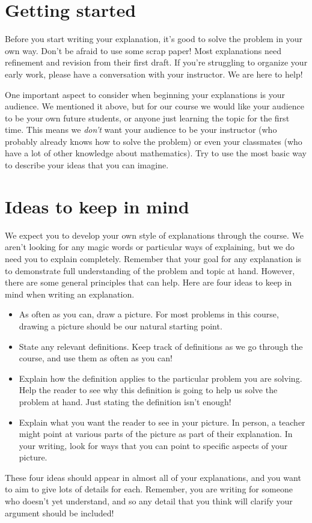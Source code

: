 \documentclass[noauthor,nooutcomes]{ximera}
\begin{document}
\section{Getting started}
Before you start writing your explanation, it's good to solve the problem in your own way. Don't be afraid to use some scrap paper! Most explanations need refinement and revision from their first draft. If you're struggling to organize your early work, please have a conversation with your instructor. We are here to help!

One important aspect to consider when beginning your explanations is your audience. We mentioned it above, but for our course we would like your audience to be your own future students, or anyone just learning the topic for the first time. This means we {\em don't} want your audience to be your instructor (who probably already knows how to solve the problem) or even your classmates (who have a lot of other knowledge about mathematics). Try to use the most basic way to describe your ideas that you can imagine.

\section{Ideas to keep in mind}
We expect you to develop your own style of explanations through the course. We aren't looking for any magic words or particular ways of explaining, but we do need you to explain completely. Remember that your goal for any explanation is to demonstrate full understanding of the problem and topic at hand. However, there are some general principles that can help. Here are four ideas to keep in mind when writing an explanation.
\begin{itemize}
	\item As often as you can, draw a picture. For most problems in this course, drawing a picture should be our natural starting point.
	\item State any relevant definitions. Keep track of definitions as we go through the course, and use them as often as you can!
	\item Explain how the definition applies to the particular problem you are solving. Help the reader to see why this definition is going to help us solve the problem at hand. Just stating the definition isn't enough!
	\item Explain what you want the reader to see in your picture. In person, a teacher might point at various parts of the picture as part of their explanation. In your writing, look for ways that you can point to specific aspects of your picture.
\end{itemize}
These four ideas should appear in almost all of your explanations, and you want to aim to give lots of details for each. Remember, you are writing for someone who doesn't yet understand, and so any detail that you think will clarify your argument should be included!
\end{document}
